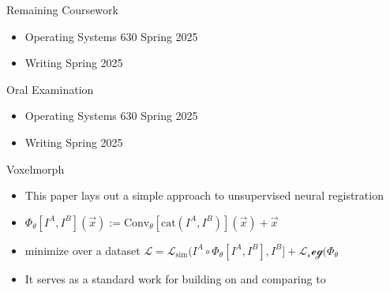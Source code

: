 \documentclass{beamer}
\begin{document}
\begin{frame}{Remaining Coursework}
        \begin{itemize}
            \item Operating Systems 630 Spring 2025
            \item Writing Spring 2025
        \end{itemize}
\end{frame}

\begin{frame}{Oral Examination}
        \begin{itemize}
            \item Operating Systems 630 Spring 2025
            \item Writing Spring 2025
        \end{itemize}
\end{frame}

\begin{frame}{Voxelmorph}
        \begin{itemize}
              \item This paper lays out a simple approach to unsupervised neural registration
		\item $ \Phi_\theta[I^A, I^B](\vec{x}) := \text{Conv}_\theta[\text{cat}(I^A, I^B)](\vec{x}) + \vec{x} $
              \item minimize over a dataset $\mathcal{L} = \mathcal{L}_\text{sim}(I^A \circ \Phi_\theta[I^A, I^B], I^B] + \mathcal{L_reg}(\Phi_\theta$
              \item It serves as a standard work for building on and comparing to

        \end{itemize}
\end{frame}
\end{document}
